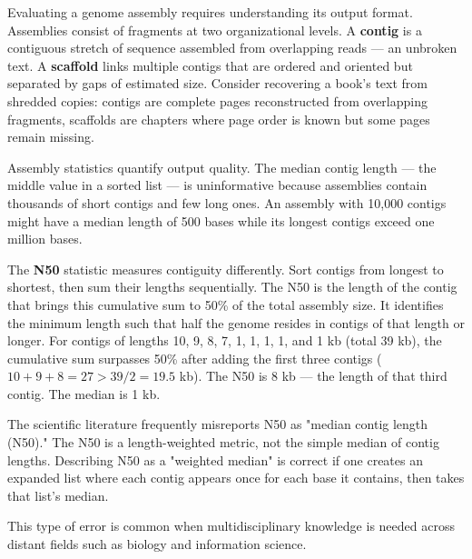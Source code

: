 \begin{commentary}
Evaluating a genome assembly requires understanding its output format. Assemblies consist of fragments at two organizational levels. A \textbf{contig} is a contiguous stretch of sequence assembled from overlapping reads — an unbroken text. A \textbf{scaffold} links multiple contigs that are ordered and oriented but separated by gaps of estimated size. Consider recovering a book's text from shredded copies: contigs are complete pages reconstructed from overlapping fragments, scaffolds are chapters where page order is known but some pages remain missing.

Assembly statistics quantify output quality. The median contig length — the middle value in a sorted list — is uninformative because assemblies contain thousands of short contigs and few long ones. An assembly with 10,000 contigs might have a median length of 500 bases while its longest contigs exceed one million bases.

The \textbf{N50} statistic measures contiguity differently. Sort contigs from longest to shortest, then sum their lengths sequentially. The N50 is the length of the contig that brings this cumulative sum to 50\% of the total assembly size. It identifies the minimum length such that half the genome resides in contigs of that length or longer. For contigs of lengths 10, 9, 8, 7, 1, 1, 1, 1, and 1 kb (total 39 kb), the cumulative sum surpasses 50\% after adding the first three contigs ($10+9+8=27>39/2=19.5$ kb). The N50 is 8 kb — the length of that third contig. The median is 1 kb.

The scientific literature frequently misreports N50 as "median contig length (N50)." The N50 is a length-weighted metric, not the simple median of contig lengths. Describing N50 as a "weighted median" is correct if one creates an expanded list where each contig appears once for each base it contains, then takes that list's median.

This type of error is common when multidisciplinary knowledge is needed across distant fields such as biology and information science.
\end{commentary}

